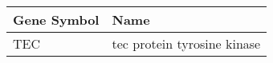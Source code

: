 \begin{tabular}{ll}
\toprule
Gene Symbol &                        Name \\
\midrule
        TEC & tec protein tyrosine kinase \\
\bottomrule
\end{tabular}
